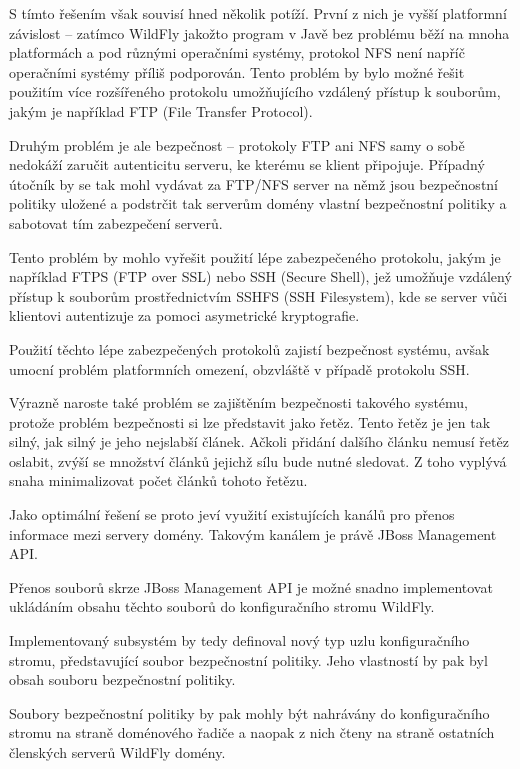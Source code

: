 S tímto řešením však souvisí hned několik potíží.
První z nich je vyšší platformní závislost -- zatímco WildFly jakožto program v Javě bez problému běží na mnoha platformách a pod různými operačními systémy, protokol NFS není napříč operačními systémy příliš podporován.
Tento problém by bylo možné řešit použitím více rozšířeného protokolu umožňujícího vzdálený přístup k souborům, jakým je například FTP (File Transfer Protocol).

Druhým problém je ale bezpečnost -- protokoly FTP ani NFS samy o sobě nedokáží zaručit autenticitu serveru, ke kterému se klient připojuje.
Případný útočník by se tak mohl vydávat za FTP/NFS server na němž jsou bezpečnostní politiky uložené a podstrčit tak serverům domény vlastní bezpečnostní politiky a sabotovat tím zabezpečení serverů.

Tento problém by mohlo vyřešit použití lépe zabezpečeného protokolu, jakým je například FTPS (FTP over SSL) nebo SSH (Secure Shell), jež umožňuje vzdálený přístup k souborům prostřednictvím SSHFS (SSH Filesystem), kde se server vůči klientovi autentizuje za pomoci asymetrické kryptografie. \cite[3]{ssh}

Použití těchto lépe zabezpečených protokolů zajistí bezpečnost systému, avšak umocní problém platformních omezení, obzvláště v případě protokolu SSH.

Výrazně naroste také problém se zajištěním bezpečnosti takového systému, protože problém bezpečnosti si lze představit jako řetěz.
Tento řetěz je jen tak silný, jak silný je jeho nejslabší článek.
Ačkoli přidání dalšího článku nemusí řetěz oslabit, zvýší se množství článků jejichž sílu bude nutné sledovat.
Z toho vyplývá snaha minimalizovat počet článků tohoto řetězu.

Jako optimální řešení se proto jeví využití existujících kanálů pro přenos informace mezi servery domény.
Takovým kanálem je právě JBoss Management API.

Přenos souborů skrze JBoss Management API je možné snadno implementovat ukládáním obsahu těchto souborů do konfiguračního stromu WildFly.

Implementovaný subsystém by tedy definoval nový typ uzlu konfiguračního stromu, představující soubor bezpečnostní politiky. Jeho vlastností by pak byl obsah souboru bezpečnostní politiky.

Soubory bezpečnostní politiky by pak mohly být nahrávány do konfiguračního stromu na straně doménového řadiče a naopak z nich čteny na straně ostatních členských serverů WildFly domény.

